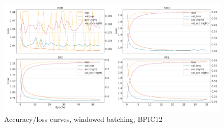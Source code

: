 \begin{figure}[!htb]
    \centering
    \includegraphics[width=\textwidth]{gfx/bpic2012/windowed_loss_acc_curve.pdf}
    \caption{Accuracy/loss curves, windowed batching, BPIC12}
\end{figure}
\FloatBarrier

